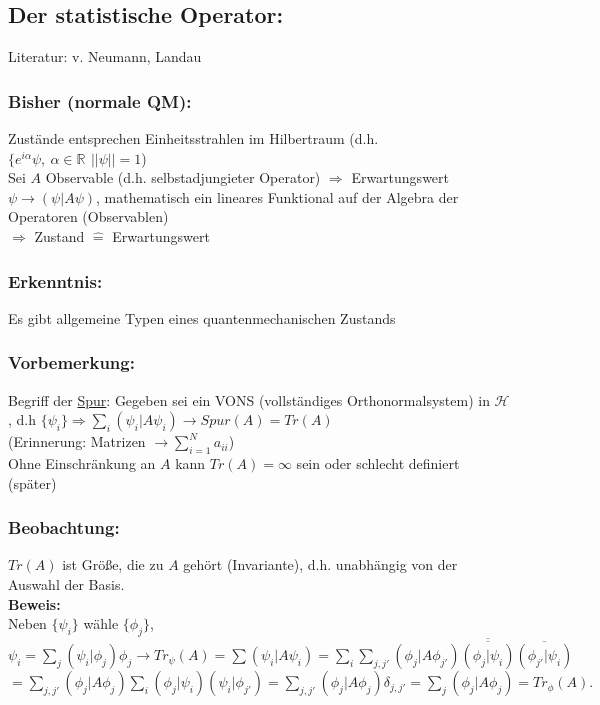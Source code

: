 \documentclass[twoside,a4paper]{scrartcl}
\newcommand{\R}{\mathbb{R}}
\renewcommand{\1}{\mathds{1}}
\newcommand{\Ra}{\Rightarrow}
\newcommand{\ra}{\rightarrow}
\renewcommand{\H}{\mathcal{H}}
\renewcommand{\R}{\mathbb{R}}
\begin{document}


\subsection{Der statistische Operator:}
Literatur: v. Neumann, Landau

\subsubsection*{Bisher (normale QM):}
Zustände entsprechen Einheitsstrahlen im Hilbertraum (d.h. $\{e^{i\alpha}\psi, \ \alpha \in \R \, \ ||\psi||=1$)\\
Sei $A$ Observable (d.h. selbstadjungieter Operator) $\Ra$ Erwartungswert $\psi \ra (\psi|A\psi)$, mathematisch ein lineares Funktional auf der Algebra der Operatoren (Observablen)\\
$\Ra$ Zustand $ \mathrel{\widehat{=}}$ Erwartungswert

\subsubsection*{Erkenntnis:}
Es gibt allgemeine Typen eines quantenmechanischen Zustands
\subsubsection*{Vorbemerkung:}
Begriff der \underline{Spur}: Gegeben sei ein VONS (vollständiges Orthonormalsystem) in $\H$ , d.h $\{\psi_i\} \Ra \sum_i(\psi_i|A\psi_i) \ra Spur(A)=Tr(A)$\\
(Erinnerung: Matrizen $\ra \sum_{i=1}^N a_{ii}$)\\
Ohne Einschränkung an $A$ kann $Tr(A)=\infty$ sein oder schlecht definiert (später)

\subsubsection*{Beobachtung:}
$Tr(A)$ ist Größe, die zu $A$ gehört (Invariante), d.h. unabhängig von der Auswahl der Basis.\\
\textbf{Beweis:}\\
Neben $\{\psi_i\}$ wähle $\{\phi_j\}$, $\psi_i=\sum_j (\psi_i|\phi_j)\phi_j \ra Tr_\psi (A)=\sum (\psi_i|A\psi_i)=\sum_i \sum_{j,j'} (\phi_j|A\phi_{j'})\overline{\overline{(\phi_j|\psi_i)}}\overline{(\phi_{j'}|\psi_i)}$\\
$=\sum_{j,j'} (\phi_j|A\phi_j)\sum_i (\phi_j|\psi_i)(\psi_i|\phi_{j'})=\sum_{j,j'} (\phi_j|A\phi_j)\delta_{j,j'}=\sum_j(\phi_j|A\phi_j)=Tr_\phi(A).$
\end{document}
